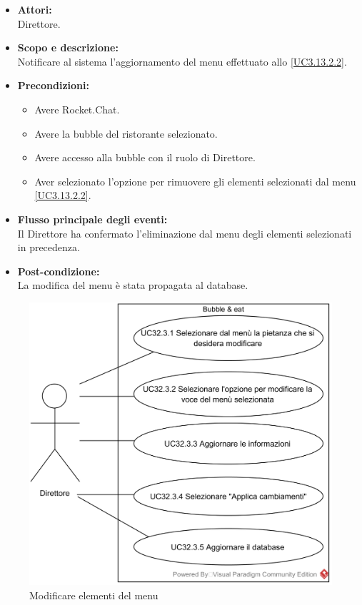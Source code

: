 
\begin{itemize}
	\item \textbf{Attori:}
	\\Direttore.
	\item \textbf{Scopo e descrizione:} 
	\\Notificare al sistema l'aggiornamento del menu effettuato allo \ref{UC3.13.2.2}.
	\item \textbf{Precondizioni:}
	\begin{itemize}
		\item Avere Rocket.Chat.
		\item Avere la bubble del ristorante selezionato.
		\item Avere accesso alla bubble con il ruolo di Direttore.
		\item Aver selezionato l'opzione per rimuovere gli elementi selezionati dal menu \ref{UC3.13.2.2}.
	\end{itemize}
	\item \textbf{Flusso principale degli eventi:}
	\\Il Direttore ha confermato l'eliminazione dal menu degli elementi selezionati in precedenza.
	\item \textbf{Post-condizione:}
	\\La modifica del menu è stata propagata al database.
\end{itemize}

\begin{samepage}
\nopagebreak
\begin{figure}[H]
	\centering
	\includegraphics[width=15cm]{../../documenti/AnalisiDeiRequisiti/Diagrammi_img/usecase/uc3_13_3.png}
	\caption{\UCFCaption{} Modificare elementi del menu}
\end{figure}
\end{samepage}

